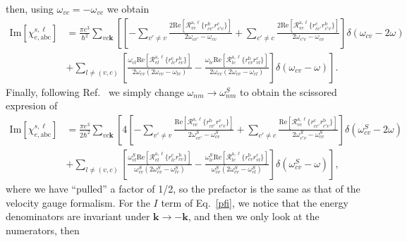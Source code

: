 then, using $\omega_{vc}=-\omega_{vc}$ we obtain
\begin{align}\label{imchie3n}
\mathrm{Im}[\chi_{e,\mathrm{a}\mathrm{b}\mathrm{c}}^{s,\ell}]
&=
\frac{\pi e^3}{\hbar^2} 
\sum_{vc\mathbf{k}}
\left[
\left[
-\sum_{v'\ne v}
\frac{2\mathrm{Re}[\mathcal{R}^{\mathrm{a},\ell}_{vc}\{r^{\mathrm{b}}_{cv'}r^{\mathrm{c}}_{v'v}\}]
}{2\omega_{cv'}-\omega_{cv}}
+
\sum_{c'\ne c}
\frac{2\mathrm{Re}[\mathcal{R}^{\mathrm{a},\ell}_{vc}\{r^{\mathrm{c}}_{cc'}r^{\mathrm{b}}_{c'v}\}]}
{2\omega_{c'v}-\omega_{cv}}
\right]
\delta(\omega_{cv}-2\omega)
\right.
\nonumber\\
&+
\left.
\sum_{l\neq(v,c)}
\left[
\frac{\omega_{vl}\mathrm{Re}[\mathcal{R}^{\mathrm{a},\ell}_{vl}\{r^{\mathrm{c}}_{lc}r^{\mathrm{b}}_{cv}\}]}
{2\omega_{cv}(2\omega_{cv}-\omega_{lv})}
-
\frac{\omega_{lc}\mathrm{Re}[\mathcal{R}^{\mathrm{a},\ell}_{lc}\{r^{\mathrm{b}}_{cv}r^{\mathrm{c}}_{vl}\}]}
{2\omega_{cv}(2\omega_{cv}-\omega_{cl})}
\right]
\delta(\omega_{cv}-\omega)
\right]
.
\end{align}  
Finally, following Ref.~\cite{nastosPRB05, cabellosPRB09} we simply change
$\omega_{nm}\to\omega_{nm}^S$ to obtain the scissored expresion of
\begin{align}\label{imchies}
\mathrm{Im}[\chi_{e,\mathrm{a}\mathrm{b}\mathrm{c}}^{s,\ell}]
&=
\frac{\pi e^3}{2\hbar^2} 
\sum_{vc\mathbf{k}}
\left[
4
\left[
-\sum_{v'\ne v}
\frac{\mathrm{Re}[\mathcal{R}^{\mathrm{a},\ell}_{vc}\{r^{\mathrm{b}}_{cv'}r^{\mathrm{c}}_{v'v}\}]
}{2\omega^S_{cv'}-\omega^S_{cv}}
+
\sum_{c'\ne c}
\frac{\mathrm{Re}[\mathcal{R}^{\mathrm{a},\ell}_{vc}\{r^{\mathrm{c}}_{cc'}r^{\mathrm{b}}_{c'v}\}]}
{2\omega^S_{c'v}-\omega^S_{cv}}
\right]
\delta(\omega^S_{cv}-2\omega)
\right.
\nonumber\\
&+
\left.
\sum_{l\neq(v,c)}
\left[
\frac{\omega^S_{vl}\mathrm{Re}[\mathcal{R}^{\mathrm{a},\ell}_{vl}\{r^{\mathrm{c}}_{lc}r^{\mathrm{b}}_{cv}\}]}
{\omega^S_{cv}(2\omega^S_{cv}-\omega^S_{lv})}
-
\frac{\omega^S_{lc}\mathrm{Re}[\mathcal{R}^{\mathrm{a},\ell}_{lc}\{r^{\mathrm{b}}_{cv}r^{\mathrm{c}}_{vl}\}]}
{\omega^S_{cv}(2\omega^S_{cv}-\omega^S_{cl})}
\right]
\delta(\omega^S_{cv}-\omega)
\right]
,
\end{align}  
where we have ``pulled'' a factor of 1/2, so the prefactor is the same
as that of the velocity gauge formalism.\cite{cabellosPRB09} 
For the $I$ term of Eq.~\eqref{pfi}, we notice that the energy
denominators are invariant under $\mathbf{k}\to -\mathbf{k}$, and then we only
look at the numerators, then
